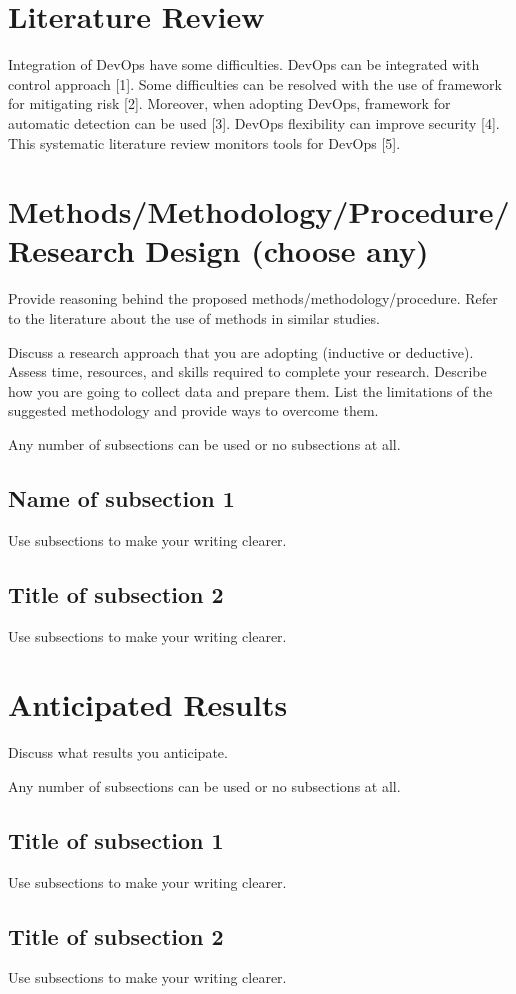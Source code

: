 \documentclass[oneside,final,12pt,a4paper]{extreport}
\begin{document}
\section{Literature Review}

Integration of DevOps have some difficulties. DevOps can be integrated with control approach [1]. Some difficulties can be resolved with the use of framework for mitigating risk [2]. Moreover, when adopting DevOps, framework for automatic detection can be used [3]. DevOps flexibility can improve security [4]. This systematic literature review monitors tools for DevOps [5].

\section{Methods/Methodology/Procedure/Research Design (choose any)}
Provide reasoning behind the proposed methods/methodology/procedure. Refer to the literature about the use of methods in similar studies. 

Discuss a research approach that you are adopting (inductive or deductive). Assess time, resources, and skills required to complete your research. Describe how you are going to collect data and prepare them. List the limitations of the suggested methodology and provide ways to overcome them.


Any number of subsections can be used or no subsections at all.
\subsection{Name of subsection 1}
Use subsections to make your writing clearer.
\subsection{Title of subsection 2}
Use subsections to make your writing clearer. 
\section{Anticipated Results}
Discuss what results you anticipate. 

Any number of subsections can be used or no subsections at all.
\subsection{Title of subsection 1}
Use subsections to make your writing clearer.
\subsection{Title of subsection 2}
Use subsections to make your writing clearer.
\end{document}
